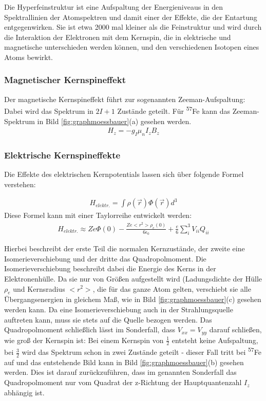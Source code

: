 \documentclass[german, %
parskip=full, %
bibliography=totoc, %
]{scrartcl}
\begin{document}
Die Hyperfeinstruktur ist eine Aufspaltung der Energieniveaus in den Spektrallinien der Atomspektren und damit einer der Effekte, die der Entartung entgegenwirken. Sie ist etwa 2000 mal kleiner als die Feinstruktur und wird durch die Interaktion der Elektronen mit dem Kernspin, die in elektrische und magnetische unterschieden werden können, und den verschiedenen Isotopen eines Atoms bewirkt. \cite{hyperfein}

\subsubsection{Magnetischer Kernspineffekt}

Der magnetische Kernspineffekt führt zur sogenannten Zeeman-Aufspaltung: Dabei wird das Spektrum in $2I+1$ Zustände geteilt. Für \textsuperscript{57}Fe kann das Zeeman-Spektrum in Bild \ref{fig:graphmoessbauer}(a) gesehen werden.  
\begin{align}
H_z = -g_I \mu_n I_z B_z \label{for:magKSpin}
\end{align}

\subsubsection{Elektrische Kernspineffekte}

Die Effekte des elektrischen Kernpotentials lassen sich über folgende Formel verstehen:

\begin{align}
H_{elektr.} = \int \rho (\vec r) \Phi (\vec r) d^3 \label{for:eleKSpin}
\end{align}
Diese Formel kann mit einer Taylorreihe entwickelt werden:
\begin{align}
H_{elektr.} \approx Z e \Phi (0) - \frac{Z e < r^2 > \rho_e (0)}{6 \epsilon_0} + \frac{e}{6}\sum_i^3 V_{ii} Q_{ii} \label{for:eleKSpin_f}
\end{align}

Hierbei beschreibt der erste Teil die normalen Kernzustände, der zweite eine Isomerieverschiebung und der dritte das Quadropolmoment. Die Isomerieverschiebung beschreibt dabei die Energie des Kerns in der Elektronenhülle. Da sie nur von Größen aufgestellt wird (Ladungsdichte der Hülle $\rho_e$ und Kernsradius $<r^2>$, die für das ganze Atom gelten, verschiebt sie alle Übergangsenergien in gleichem Maß, wie in Bild \ref{fig:graphmoessbauer}(c) gesehen werden kann. Da eine Isomerieverschiebung auch in der Strahlungsquelle auftreten kann, muss sie stets auf die Quelle bezogen werden. Das Quadropolmoment schließlich lässt im Sonderfall, dass $V_{xx} = V_{yy}$ darauf schließen, wie groß der Kernspin ist: Bei einem Kernspin von $\frac{1}{2}$ entsteht keine Aufspaltung, bei $\frac{3}{2}$ wird das Spektrum schon in zwei Zustände geteilt - dieser Fall tritt bei \textsuperscript{57}Fe auf und das entstehende Bild kann in Bild \ref{fig:graphmoessbauer}(b) gesehen werden. Dies ist darauf zurückzuführen, dass im genannten Sonderfall das Quadropolmoment nur vom Quadrat der z-Richtung der Hauptquantenzahl $I_z$ abhängig ist.
\end{document}
